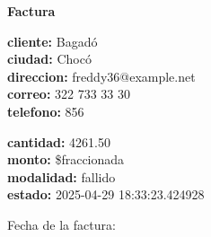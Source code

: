 \documentclass{article}
\begin{document}
\begin{center}
    {\LARGE \textbf{Factura}}\\[1cm]
\end{center}

\textbf{cliente:} Bagadó \\
\textbf{ciudad:} Chocó \\
\textbf{direccion:} freddy36@example.net \\
\textbf{correo:} 322 733 33 30 \\
\textbf{telefono:} 856 \\

\vspace{0.5cm}

\textbf{cantidad:} 4261.50 \\
\textbf{monto:} \$fraccionada \\
\textbf{modalidad:} fallido \\
\textbf{estado:} 2025-04-29 18:33:23.424928 \\

\vspace{1cm}

Fecha de la factura: 
\end{document}
